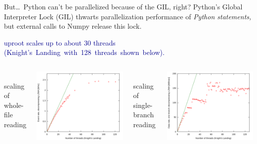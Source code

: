 \documentclass[aspectratio=169]{beamer}
\begin{document}
\begin{frame}{But\ldots\ Python can't be parallelized because of the GIL, right?}
\vspace{0.4 cm}
{\large Python's Global Interpreter Lock (GIL) thwarts parallelization performance of {\it Python statements,} but external calls to Numpy release this lock.}

\vspace{0.35 cm}
\textcolor{darkblue}{uproot scales up to about 30 threads \mbox{(Knight's Landing with 128 threads shown below).\hspace{-1 cm}}}

\vspace{0.35 cm}
\begin{columns}
\mbox{ } \hfill scaling of whole-file reading \hfill \mbox{ }

\vspace{0.2 cm}
\includegraphics[width=\linewidth]{uproot-scaling.png}

\mbox{ } \hfill scaling of single-branch reading \hfill \mbox{ }

\vspace{0.2 cm}
\includegraphics[width=\linewidth]{uproot-scaling-2.png}
\end{columns}
\end{frame}
\end{document}
